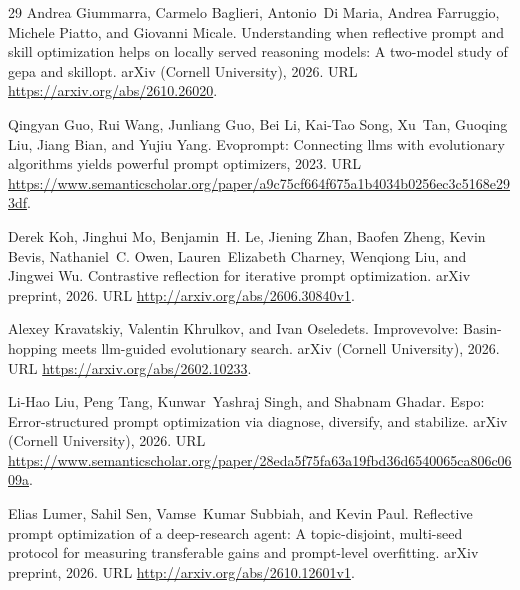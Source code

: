 \documentclass[10pt]{article}
\begin{document}
\begin{thebibliography}{29}
Andrea Giummarra, Carmelo Baglieri, Antonio~Di Maria, Andrea Farruggio, Michele
  Piatto, and Giovanni Micale.
\newblock Understanding when reflective prompt and skill optimization helps on
  locally served reasoning models: A two-model study of gepa and skillopt.
\newblock arXiv (Cornell University), 2026.
\newblock URL \url{https://arxiv.org/abs/2610.26020}.

Qingyan Guo, Rui Wang, Junliang Guo, Bei Li, Kai-Tao Song, Xu~Tan, Guoqing Liu,
  Jiang Bian, and Yujiu Yang.
\newblock Evoprompt: Connecting llms with evolutionary algorithms yields
  powerful prompt optimizers, 2023.
\newblock URL
  \url{https://www.semanticscholar.org/paper/a9c75cf664f675a1b4034b0256ec3c5168e293df}.

Derek Koh, Jinghui Mo, Benjamin~H. Le, Jiening Zhan, Baofen Zheng, Kevin Bevis,
  Nathaniel~C. Owen, Lauren~Elizabeth Charney, Wenqiong Liu, and Jingwei Wu.
\newblock Contrastive reflection for iterative prompt optimization.
\newblock arXiv preprint, 2026.
\newblock URL \url{http://arxiv.org/abs/2606.30840v1}.

Alexey Kravatskiy, Valentin Khrulkov, and Ivan Oseledets.
\newblock Improvevolve: Basin-hopping meets llm-guided evolutionary search.
\newblock arXiv (Cornell University), 2026.
\newblock URL \url{https://arxiv.org/abs/2602.10233}.

Li-Hao Liu, Peng Tang, Kunwar~Yashraj Singh, and Shabnam Ghadar.
\newblock Espo: Error-structured prompt optimization via diagnose, diversify,
  and stabilize.
\newblock arXiv (Cornell University), 2026.
\newblock URL
  \url{https://www.semanticscholar.org/paper/28eda5f75fa63a19fbd36d6540065ca806c0609a}.

Elias Lumer, Sahil Sen, Vamse~Kumar Subbiah, and Kevin Paul.
\newblock Reflective prompt optimization of a deep-research agent: A
  topic-disjoint, multi-seed protocol for measuring transferable gains and
  prompt-level overfitting.
\newblock arXiv preprint, 2026.
\newblock URL \url{http://arxiv.org/abs/2610.12601v1}.


\end{thebibliography}
\end{document}
